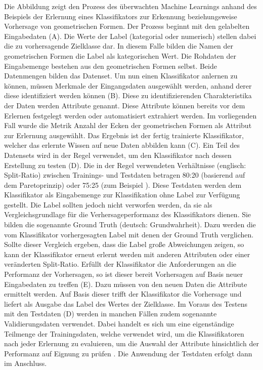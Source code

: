 Die Abbildung zeigt den Prozess des überwachten Machine Learnings anhand des Beispiels der Erlernung eines Klassifikators zur Erkennung beziehungsweise Vorhersage von geometrischen Formen. Der Prozess beginnt mit den \glqq gelabelten\grqq{} Eingabedaten (A). Die Werte der Label (kategorial oder numerisch) stellen dabei die zu vorhersagende Zielklasse dar. In diesem Falle bilden die Namen der geometrischen Formen die Label als kategorischen Wert. Die Rohdaten der Eingabemenge bestehen aus den geometrischen Formen selbst. Beide Datenmengen bilden das Datenset. Um nun einen Klassifikator anlernen zu können, müssen Merkmale der Eingangsdaten ausgewählt werden, anhand derer diese identifiziert werden können (B). Diese zu identifizierenden Charakteristika der Daten werden Attribute genannt. Diese Attribute können bereits vor dem Erlernen festgelegt werden oder automatisiert extrahiert werden. Im vorliegenden Fall wurde die Metrik \glqq Anzahl der Ecken der geometrischen Formen\grqq{} als Attribut zur Erlernung ausgewählt. Das Ergebnis ist der fertig trainierte Klassifikator, welcher das erlernte Wissen auf neue Daten abbilden kann (C). Ein Teil des Datensets wird in der Regel verwendet, um den Klassifikator nach dessen Erstellung zu testen (D). Die in der Regel verwendeten Verhältnisse (englisch: Split-Ratio) zwischen Trainings- und Testdaten betragen 80:20 (basierend auf dem Paretoprinzip) oder 75:25 (zum Beispiel \cite{Queiroz2016}). Diese Testdaten werden dem Klassifikator als Eingabemenge zur Klassifikation ohne Label zur Verfügung gestellt. Die Label sollten jedoch nicht verworfen werden, da sie als Vergleichsgrundlage für die Verhersageperformanz des Klassifikators dienen. Sie bilden die sogenannte \glqq Ground Truth\grqq{} (deutsch: Grundwahrheit). Dazu werden die vom Klassifikator vorhergesagten Label mit denen der Ground Truth verglichen. Sollte dieser Vergleich ergeben, dass die Label große Abweichungen zeigen, so kann der Klassifikator erneut erlernt werden mit anderen Attributen oder einer veränderten Split-Ratio. Erfüllt der Klassifikator die Anforderungen an die Performanz der Vorhersagen, so ist dieser bereit Vorhersagen auf Basis neuer Eingabedaten zu treffen (E). Dazu müssen von den neuen Daten die Attribute ermittelt werden. Auf Basis dieser trifft der Klassifikator die Vorhersage und liefert als Ausgabe das Label des Wertes der Zielklasse. Im Voraus des Testens mit den Testdaten (D) werden in manchen Fällen zudem sogenannte Validierungsdaten verwendet. Dabei handelt es sich um eine eigenständige Teilmenge der Trainingsdaten, welche verwendet wird, um die Klassifikatoren nach jeder Erlernung zu evaluieren, um die Auswahl der Attribute hinsichtlich der Performanz auf Eignung zu prüfen \cite{Sammut2017}. Die Anwendung der Testdaten erfolgt dann im Anschluss.

